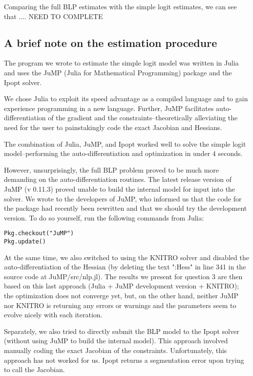 \documentclass[a4paper,11pt]{article}
\begin{document}
Comparing the full BLP estimates with the simple logit estimates, we can see that .... NEED TO COMPLETE



\subsection*{A brief note on the estimation procedure}
The program we wrote to estimate the simple logit model was written in Julia and uses the JuMP (Julia for Mathematical Programming) package and the Ipopt solver.

We chose Julia to exploit its speed advantage as a compiled language and to gain experience programming in a new language. Further, JuMP facilitates auto-differentiation of the gradient and the constraints--theoretically alleviating the need for the user to painstakingly code the exact Jacobian and Hessians.

The combination of Julia, JuMP, and Ipopt worked well to solve the simple logit model--performing the auto-differentiation and optimization in under 4 seconds.

However, unsurprisingly, the full BLP problem proved to be much more demanding on the auto-differentiation routines. The latest release version of JuMP (v 0.11.3) proved unable to build the internal model for input into the solver. We wrote to the developers of JuMP, who informed us that the code for the package had recently been rewritten and that we should try the development version. To do so yourself, run the following commands from Julia:
\begin{lstlisting}
Pkg.checkout("JuMP")
Pkg.update()
\end{lstlisting}
At the same time, we also switched to using the KNITRO solver and disabled the auto-differentiation of the Hessian (by deleting the text ":Hess" in line 341 in the source code at JuMP/src/nlp.jl). The results we present for question 3 are then based on this last approach (Julia + JuMP development version + KNITRO); the optimization does not converge yet, but, on the other hand, neither JuMP nor KNITRO is returning any errors or warnings and the parameters seem to evolve nicely with each iteration. 

Separately, we also tried to directly submit the BLP model to the Ipopt solver (without using JuMP to build the internal model). This approach involved manually coding the exact Jacobian of the constraints. Unfortunately, this approach has not worked for us. Ipopt returns a  segmentation error upon trying to call the Jacobian.
\end{document}
